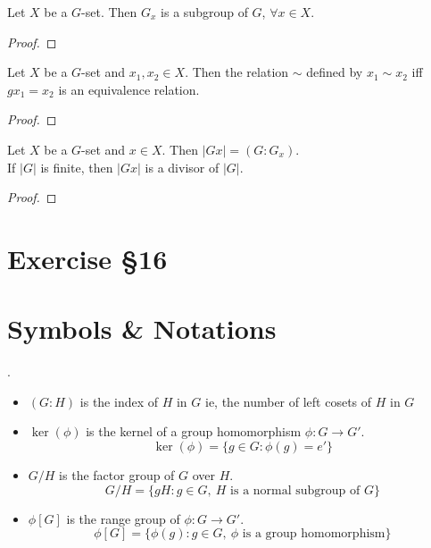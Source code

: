 \begin{theorem}
	Let $X$ be a $G$-set. Then $G_x$ is a subgroup of $G$, $\forall x \in X$.
\end{theorem}
\begin{proof}
\end{proof}

\begin{theorem}
	Let $X$ be a $G$-set and $x_1,x_2 \in X$. Then the relation $\sim$ defined by $x_1 \sim x_2$ iff $gx_1 = x_2$ is an equivalence relation.
\end{theorem}
\begin{proof}
\end{proof}

\begin{theorem}
	Let $X$ be a $G$-set and $x \in X$. Then $|Gx| = (G:G_x)$.\\
	If $|G|$ is finite, then $|Gx|$ is a divisor of $|G|$.
\end{theorem}
\begin{proof}
\end{proof}

\pagebreak

\section{Exercise \S16}

\pagebreak

\section*{Symbols \& Notations}
\begin{definition}.
	\begin{itemize}
		\item $(G:H)$ is the index of $H$ in $G$ ie, the number of left cosets of $H$ in $G$ %
		\item $\ker(\phi)$ is the kernel of a group homomorphism $\phi : G \to G'$.
			$$\ker(\phi) = \{ g \in G : \phi(g) = e' \}$$
		\item $G/H$ is the factor group of $G$ over $H$.
			$$G/H = \{ gH : g \in G,\ H \text{ is a normal subgroup of } G\}$$
		\item $\phi[G]$ is the range group of $\phi: G \to G'$.
			$$\phi[G] = \{ \phi(g) : g \in G,\ \phi \text{ is a group homomorphism} \}$$
	\end{itemize}
\end{definition}
